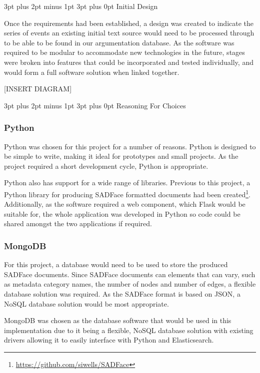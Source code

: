 \documentclass[12pt,a4paper]{article}
\makeatletter
\renewcommand\subsection{\@startsection {subsection}{1}{2mm} %
                               {3pt plus 2pt minus 1pt} %
                               {3pt plus 0pt} %
                               {\normalfont\bfseries}}
\makeatother
\begin{document}
\subsection{Initial Design}

Once the requirements had been established, a design was created to indicate the series of events an existing initial text source would need to be processed through to be able to be found in our argumentation database. As the software was required to be modular to accommodate new technologies in the future, stages were broken into features that could be incorporated and tested individually, and would form a full software solution when linked together.

[INSERT DIAGRAM]

\subsection{Reasoning For Choices}

\subsubsection{Python}

Python was chosen for this project for a number of reasons. Python is designed to be simple to write, making it ideal for prototypes and small projects. As the project required a short development cycle, Python is appropriate.

Python also has support for a wide range of libraries. Previous to this project, a Python library for producing SADFace formatted documents had been created\footnote{\url{https://github.com/siwells/SADFace}}. Additionally, as the software required a web component, which Flask would be suitable for, the whole application was developed in Python so code could be shared amongst the two applications if required.

\subsubsection{MongoDB}

For this project, a database would need to be used to store the produced SADFace documents. Since SADFace documents can elements that can vary, such as metadata category names, the number of nodes and number of edges, a flexible database solution was required. As the SADFace format is based on JSON, a NoSQL database solution would be most appropriate. 

MongoDB was chosen as the database software that would be used in this implementation due to it being a flexible, NoSQL database solution with existing drivers allowing it to easily interface with Python and Elasticsearch.
\end{document}

